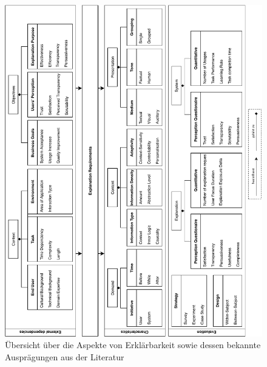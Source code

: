 \begin{figure}[htb!]
    \begin{center}
        \includegraphics[width=\textwidth]{contents/05_model_description/res/model_overview_complete.pdf}
    \end{center}
    \caption{Übersicht über die Aspekte von Erklärbarkeit sowie dessen bekannte Ausprägungen aus der Literatur}
    \label{fig:model_overview_complete}
\end{figure}

\newpage



